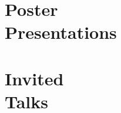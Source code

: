 \documentclass[margin,line]{resume}
\begin{document}
\begin{resume}
    \section{\mysidestyle Poster\\Presentations}
    \begin{bibenum}
        \item {}
    \end{bibenum}

    \section{\mysidestyle Invited\\Talks}


\end{resume}
\end{document}
